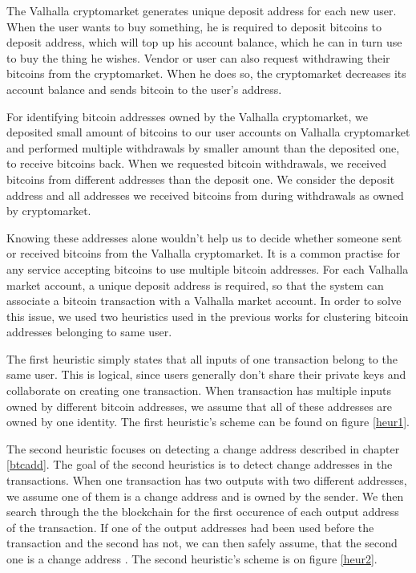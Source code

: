 \documentclass[
  digital, %
  table,   %
  lof,     %
  lot,     %
  oneside
]{fithesis3}
\begin{document}
The Valhalla cryptomarket generates unique deposit address for each new user.
When the user wants to buy something, he is required to deposit bitcoins to deposit address,
which will top up his account balance, which he can in turn use to buy the thing he wishes.
Vendor or user can also request withdrawing their bitcoins from the cryptomarket. When he does so,
the cryptomarket decreases its account balance and sends bitcoin to the user's address.

For identifying bitcoin addresses owned by the Valhalla cryptomarket, we 
deposited small amount of bitcoins to our user accounts on Valhalla cryptomarket and
performed multiple withdrawals by smaller amount than the deposited one, to receive bitcoins back.
When we requested bitcoin withdrawals, we received bitcoins from different addresses
than the deposit one. We consider the deposit address and all addresses we received
bitcoins from during withdrawals as owned by cryptomarket.

Knowing these addresses alone wouldn't help us to decide
whether someone sent or received bitcoins from the Valhalla cryptomarket.
It is a common practise for any service accepting bitcoins to
use multiple bitcoin addresses.
For each Valhalla market account,
a unique deposit address is required, so that the system can associate
a bitcoin transaction with a Valhalla market account.
In order to solve this issue, we used two heuristics used
in the previous works \parencite{androulaki2013evaluating}\parencite{reid2013analysis}
for clustering bitcoin addresses belonging to same user.

The first heuristic simply states that all inputs of one transaction belong to the same user. This is logical,
since users generally don't share their private keys and collaborate on creating one transaction.
When transaction has multiple inputs owned by different bitcoin addresses, we assume that all of these addresses are owned by
one identity. The first heuristic's scheme can be found on figure \ref{heur1}.

The second heuristic focuses on detecting a change address described in chapter \ref{btcadd}.
The goal of the second heuristics is to detect change addresses in the transactions.
When one transaction has two outputs with two different addresses, we assume one of them is a change
address and is owned by the sender.
We then search through the the blockchain for the first occurence of each output address of the 
transaction. If one of the output addresses had been used before the transaction and the second has not,
we can then safely assume, that the second one is a change address \parencite{androulaki2013evaluating}.
The second heuristic's scheme is on figure \ref{heur2}.
\end{document}
